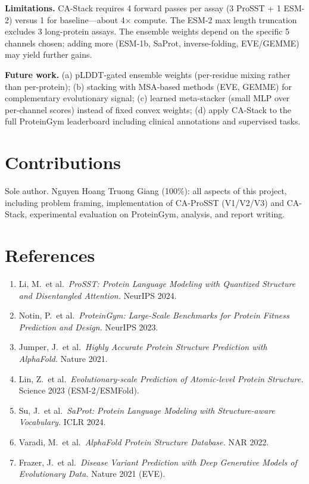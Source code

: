 \documentclass[11pt,a4paper]{article}
\begin{document}
\textbf{Limitations.} CA-Stack requires 4 forward passes per assay
(3 ProSST + 1 ESM-2) versus 1 for baseline---about 4$\times$ compute.
The ESM-2 max length truncation excludes 3 long-protein assays. The
ensemble weights depend on the specific 5 channels chosen; adding
more (ESM-1b, SaProt, inverse-folding, EVE/GEMME) may yield further
gains.

\textbf{Future work.} (a) pLDDT-gated ensemble weights (per-residue
mixing rather than per-protein); (b) stacking with MSA-based
methods (EVE, GEMME) for complementary evolutionary signal;
(c) learned meta-stacker (small MLP over per-channel scores) instead
of fixed convex weights; (d) apply CA-Stack to the full ProteinGym
leaderboard including clinical annotations and supervised tasks.

\section*{Contributions}
Sole author. Nguyen Hoang Truong Giang (100\%): all aspects of this
project, including problem framing, implementation of CA-ProSST
(V1/V2/V3) and CA-Stack, experimental evaluation on ProteinGym,
analysis, and report writing.

\section*{References}
\begin{enumerate}[leftmargin=*, itemsep=0pt]
    \item Li, M.\ et al.\ \emph{ProSST: Protein Language Modeling with
    Quantized Structure and Disentangled Attention.} NeurIPS 2024.
    \item Notin, P.\ et al.\ \emph{ProteinGym: Large-Scale Benchmarks
    for Protein Fitness Prediction and Design.} NeurIPS 2023.
    \item Jumper, J.\ et al.\ \emph{Highly Accurate Protein Structure
    Prediction with AlphaFold.} Nature 2021.
    \item Lin, Z.\ et al.\ \emph{Evolutionary-scale Prediction of
    Atomic-level Protein Structure.} Science 2023 (ESM-2/ESMFold).
    \item Su, J.\ et al.\ \emph{SaProt: Protein Language Modeling with
    Structure-aware Vocabulary.} ICLR 2024.
    \item Varadi, M.\ et al.\ \emph{AlphaFold Protein Structure Database.}
    NAR 2022.
    \item Frazer, J.\ et al.\ \emph{Disease Variant Prediction with
    Deep Generative Models of Evolutionary Data.} Nature 2021 (EVE).
\end{enumerate}
\end{document}
